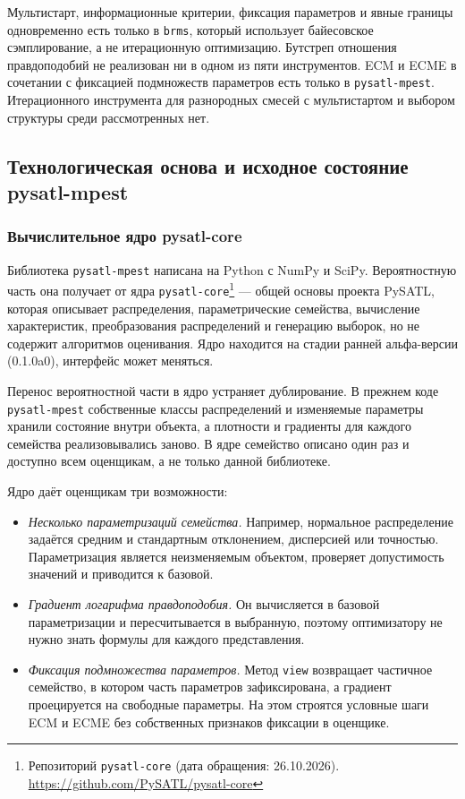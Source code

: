 Мультистарт, информационные критерии, фиксация параметров и явные границы одновременно есть только в \texttt{brms}, который использует байесовское сэмплирование, а не итерационную оптимизацию. Бутстреп отношения правдоподобий не реализован ни в одном из пяти инструментов. ECM и ECME в сочетании с фиксацией подмножеств параметров есть только в \texttt{pysatl-mpest}. Итерационного инструмента для разнородных смесей с мультистартом и выбором структуры среди рассмотренных нет.

\subsection{Технологическая основа и исходное состояние pysatl-mpest}
\label{sec:mpest-state}

\subsubsection{Вычислительное ядро pysatl-core}
\label{sec:core}

Библиотека \texttt{pysatl-mpest} написана на Python с NumPy и SciPy. Вероятностную часть она получает от ядра \texttt{pysatl-core}\footnote{Репозиторий \texttt{pysatl-core} (дата обращения: 26.10.2026). \url{https://github.com/PySATL/pysatl-core}} --- общей основы проекта PySATL, которая описывает распределения, параметрические семейства, вычисление характеристик, преобразования распределений и генерацию выборок, но не содержит алгоритмов оценивания. Ядро находится на стадии ранней альфа-версии (0.1.0a0), интерфейс может меняться.

Перенос вероятностной части в ядро устраняет дублирование. В прежнем коде \texttt{pysatl-mpest} собственные классы распределений и изменяемые параметры хранили состояние внутри объекта, а плотности и градиенты для каждого семейства реализовывались заново. В ядре семейство описано один раз и доступно всем оценщикам, а не только данной библиотеке.

Ядро даёт оценщикам три возможности:
\begin{itemize}
    \item \textit{Несколько параметризаций семейства.} Например, нормальное распределение задаётся средним и стандартным отклонением, дисперсией или точностью. Параметризация является неизменяемым объектом, проверяет допустимость значений и приводится к базовой.
    \item \textit{Градиент логарифма правдоподобия.} Он вычисляется в базовой параметризации и пересчитывается в выбранную, поэтому оптимизатору не нужно знать формулы для каждого представления.
    \item \textit{Фиксация подмножества параметров.} Метод \texttt{view} возвращает частичное семейство, в котором часть параметров зафиксирована, а градиент проецируется на свободные параметры. На этом строятся условные шаги ECM и ECME без собственных признаков фиксации в оценщике.
\end{itemize}

